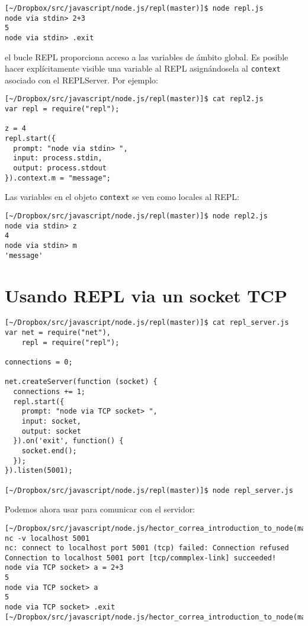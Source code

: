 \begin{verbatim}
[~/Dropbox/src/javascript/node.js/repl(master)]$ node repl.js 
node via stdin> 2+3
5
node via stdin> .exit
\end{verbatim}

el bucle REPL proporciona acceso a las variables de ámbito global. Es posible
hacer explícitamente visible una variable al REPL asignándosela al
\verb|context| asociado con el
REPLServer. Por ejemplo:

\begin{verbatim}
[~/Dropbox/src/javascript/node.js/repl(master)]$ cat repl2.js 
var repl = require("repl");

z = 4
repl.start({
  prompt: "node via stdin> ",
  input: process.stdin,
  output: process.stdout
}).context.m = "message";
\end{verbatim}
Las variables en el objeto \verb|context| se ven como locales 
al  REPL:

\begin{verbatim}
[~/Dropbox/src/javascript/node.js/repl(master)]$ node repl2.js 
node via stdin> z
4
node via stdin> m
'message'

\end{verbatim}

\section{Usando REPL via un socket TCP}
\begin{verbatim}
[~/Dropbox/src/javascript/node.js/repl(master)]$ cat repl_server.js 
var net = require("net"),
    repl = require("repl");

connections = 0;

net.createServer(function (socket) {
  connections += 1;
  repl.start({
    prompt: "node via TCP socket> ",
    input: socket,
    output: socket
  }).on('exit', function() {
    socket.end();
  });
}).listen(5001);

[~/Dropbox/src/javascript/node.js/repl(master)]$ node repl_server.js 

\end{verbatim}

Podemos ahora usar  para comunicar con el servidor:
\begin{verbatim}
[~/Dropbox/src/javascript/node.js/hector_correa_introduction_to_node(master)]$ nc -v localhost 5001
nc: connect to localhost port 5001 (tcp) failed: Connection refused
Connection to localhost 5001 port [tcp/commplex-link] succeeded!
node via TCP socket> a = 2+3
5
node via TCP socket> a
5
node via TCP socket> .exit
[~/Dropbox/src/javascript/node.js/hector_correa_introduction_to_node(master)]$ 
\end{verbatim}

